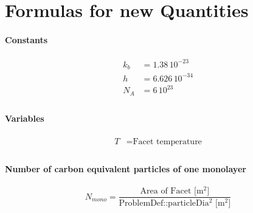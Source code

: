 
\chapter{Formulas for new Quantities}\label{chapter:Formulas}

\subsubsection*{Constants}
\begin{equation}
	\begin{split}
	k_b&=1.38\,10^{-23}\\
	h&=6.626\,10^{-34}\\
	N_A&=6\,10^{23}\\
	\end{split}
\end{equation}


\subsubsection*{Variables}
\begin{equation}
	\begin{split}
	T&=\text{Facet temperature}\\
	\end{split}
\end{equation}

\subsubsection*{Number of carbon equivalent particles of one monolayer}
\begin{equation}
	\label{eq:nmono}
	N_{mono}=\frac{\text{Area of Facet [m$^2$]}}{\text{ProblemDef::particleDia$^2$ [m$^2$]}}
\end{equation}


